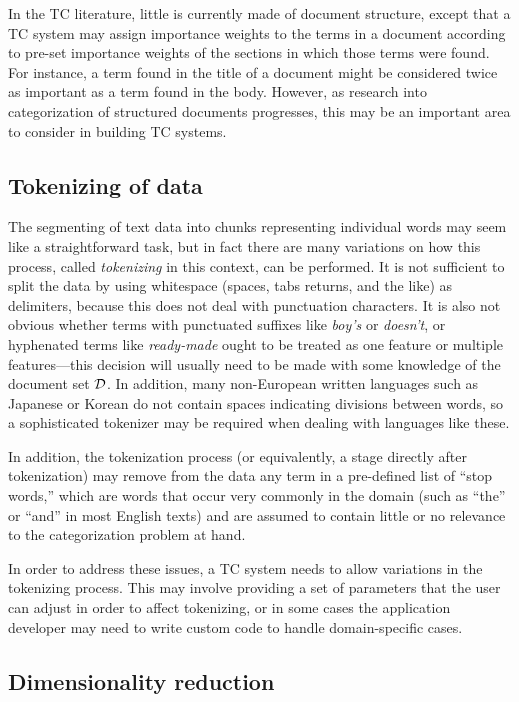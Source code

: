 In the TC literature, little is currently made of document structure,
except that a TC system may assign importance weights to the terms in
a document according to pre-set importance weights of the sections in
which those terms were found.  For instance, a term found in the title
of a document might be considered twice as important as a term found
in the body.  However, as research into categorization of structured
documents progresses, this may be an important area to consider in
building TC systems.

\subsection{Tokenizing of data}

The segmenting of text data into chunks representing individual words
may seem like a straightforward task, but in fact there are many
variations on how this process, called \emph{tokenizing} in this
context, can be performed. \cite[sec. 4.2.2]{manning:99} It is not
sufficient to split the data by using whitespace (spaces, tabs
returns, and the like) as delimiters, because this does not deal with
punctuation characters.  It is also not obvious whether terms with
punctuated suffixes like \emph{boy's} or \emph{doesn't}, or hyphenated terms
like \emph{ready-made} ought to be treated as one feature or multiple
features---this decision will usually need to be made with some
knowledge of the document set $\mathcal{D}$.  In addition, many non-European
written languages such as Japanese or Korean do not contain spaces indicating divisions between
words, so a sophisticated tokenizer may be required when dealing with
languages like these.

In addition, the tokenization process (or equivalently, a stage
directly after tokenization) may remove from the data any term in a
pre-defined list of ``stop words,'' which are words that occur very
commonly in the domain (such as ``the'' or ``and'' in most English
texts) and are assumed to contain little or no relevance to the
categorization problem at hand. \cite[p. 15]{sebastiani:02}
\cite{mladenic:98}

In order to address these issues, a TC system needs to allow
variations in the tokenizing process.  This may involve providing a
set of parameters that the user can adjust in order to affect
tokenizing, or in some cases the application developer may need to
write custom code to handle domain-specific cases.

\subsection{Dimensionality reduction}
\label{dim-reduction}

